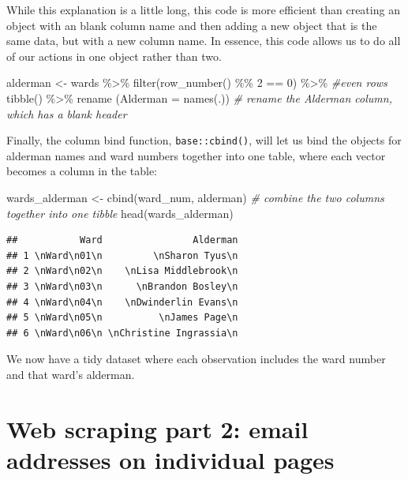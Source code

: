 \documentclass[
  krantz2]{krantz}
\makeatletter
\newenvironment{Shaded}{\begin{snugshade}}{\end{snugshade}}
\newcommand{\AttributeTok}[1]{\textcolor[rgb]{0.61,0.61,0.61}{#1}}
\newcommand{\CommentTok}[1]{\textcolor[rgb]{0.37,0.37,0.37}{\textit{#1}}}
\newcommand{\DecValTok}[1]{\textcolor[rgb]{0.06,0.06,0.06}{#1}}
\newcommand{\FunctionTok}[1]{\textcolor[rgb]{0,0,0}{#1}}
\newcommand{\NormalTok}[1]{#1}
\newcommand{\OtherTok}[1]{\textcolor[rgb]{0.37,0.37,0.37}{#1}}
\newcommand{\SpecialCharTok}[1]{\textcolor[rgb]{0,0,0}{#1}}
\newenvironment{kframe}{%
\medskip{}
\setlength{\fboxsep}{.8em}
 \def\at@end@of@kframe{}%
 \ifinner\ifhmode%
  \def\at@end@of@kframe{\end{minipage}}%
  \begin{minipage}{\columnwidth}%
 \fi\fi%
 \def\FrameCommand##1{\hskip\@totalleftmargin \hskip-\fboxsep
 \colorbox{shadecolor}{##1}\hskip-\fboxsep
     \hskip-\linewidth \hskip-\@totalleftmargin \hskip\columnwidth}%
 \MakeFramed {\advance\hsize-\width
   \@totalleftmargin\z@ \linewidth\hsize
   \@setminipage}}%
 {\par\unskip\endMakeFramed%
 \at@end@of@kframe}
\renewenvironment{Shaded}{\begin{kframe}}{\end{kframe}}
\makeatother
\begin{document}
While this explanation is a little long, this code is more efficient than creating an object with an blank column name and then adding a new object that is the same data, but with a new column name. In essence, this code allows us to do all of our actions in one object rather than two.

\begin{Shaded}
\begin{Highlighting}[]
\NormalTok{alderman }\OtherTok{\textless{}{-}}\NormalTok{ wards }\SpecialCharTok{\%\textgreater{}\%}
  \FunctionTok{filter}\NormalTok{(}\FunctionTok{row\_number}\NormalTok{() }\SpecialCharTok{\%\%} \DecValTok{2} \SpecialCharTok{==} \DecValTok{0}\NormalTok{) }\SpecialCharTok{\%\textgreater{}\%} \CommentTok{\#even rows}
  \FunctionTok{tibble}\NormalTok{() }\SpecialCharTok{\%\textgreater{}\%}
  \FunctionTok{rename}\NormalTok{ (}\AttributeTok{Alderman =} \FunctionTok{names}\NormalTok{(.)) }\CommentTok{\# rename the Alderman column, which has a blank header}
\end{Highlighting}
\end{Shaded}

Finally, the column bind function, \texttt{base::cbind()}, will let us bind the objects for alderman names and ward numbers together into one table, where each vector becomes a column in the table:

\begin{Shaded}
\begin{Highlighting}[]
\NormalTok{wards\_alderman }\OtherTok{\textless{}{-}} \FunctionTok{cbind}\NormalTok{(ward\_num, alderman) }\CommentTok{\# combine the two columns together into one tibble}
\FunctionTok{head}\NormalTok{(wards\_alderman)}
\end{Highlighting}
\end{Shaded}

\begin{verbatim}
##           Ward                Alderman
## 1 \nWard\n01\n         \nSharon Tyus\n
## 2 \nWard\n02\n    \nLisa Middlebrook\n
## 3 \nWard\n03\n      \nBrandon Bosley\n
## 4 \nWard\n04\n    \nDwinderlin Evans\n
## 5 \nWard\n05\n          \nJames Page\n
## 6 \nWard\n06\n \nChristine Ingrassia\n
\end{verbatim}

We now have a tidy dataset where each observation includes the ward number and that ward's alderman.

\hypertarget{scraping2}{%
\section{Web scraping part 2: email addresses on individual pages}\label{scraping2}}
\end{document}
